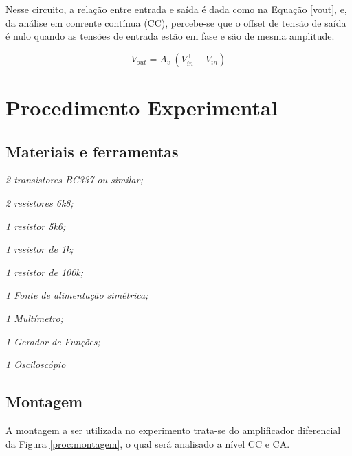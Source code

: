 \documentclass[a4paper,12pt,oneside,openany,table,xcdraw]{article}
\begin{document}
Nesse circuito, a relação entre entrada e saída é dada como na Equação \ref{vout}, e, da análise em conrente contínua (CC), percebe-se que o offset de tensão de saída é nulo quando as tensões de entrada estão em fase e são de mesma amplitude.

\begin{equation} \label{vout}
V_{out} = A_v\ (V_{in} ^+ - V_{in} ^-)
\end{equation}


\section{Procedimento Experimental}
\subsection{Materiais e ferramentas} %

\singlespacing
\begin{itemize}
\begin{multicols}{2}
\item \emph{2 transistores BC337 ou similar;}
\item \emph{2 resistores 6k8;}
\item \emph{1 resistor 5k6;}
\item \emph{1 resistor de 1k;}
\item \emph{1 resistor de 100k;}\columnbreak

\item \emph{1 Fonte de alimentação simétrica;}
\item \emph{1 Multímetro;}
\item \emph{1 Gerador de Funções;}
\item \emph{1 Osciloscópio}
\end{multicols}

\end{itemize}
\onehalfspacing

\vspace{0.2cm}
\subsection{Montagem} %
A montagem a ser utilizada no experimento trata-se do amplificador diferencial da Figura \ref{proc:montagem}, o qual será analisado a nível CC e CA.
\end{document}

